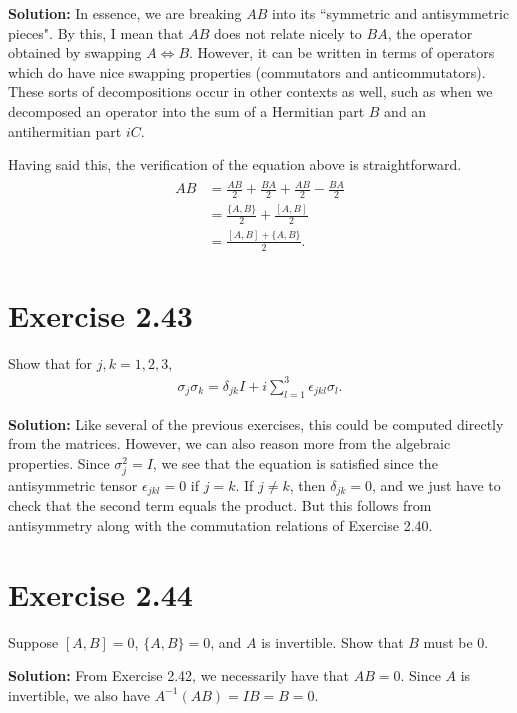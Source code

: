 \documentclass{book}
\begin{document}
    \textbf{Solution:} In essence, we are breaking $AB$ into its ``symmetric and antisymmetric pieces". By this, I mean that $AB$ does not relate nicely to $BA$, the operator obtained by swapping $A \Leftrightarrow B$. However, it can be written in terms of operators which do have nice swapping properties (commutators and anticommutators). These sorts of decompositions occur in other contexts as well, such as when we decomposed an operator into the sum of a Hermitian part $B$ and an antihermitian part $iC$. 
    
    Having said this, the verification of the equation above is straightforward.
    \begin{align}
    \begin{aligned}
        AB &= \frac{AB}{2} + \frac{BA}{2} + \frac{AB}{2} - \frac{BA}{2} \\
        &= \frac{\{A,B\}}{2} + \frac{[A,B]}{2} \\
        &= \frac{[A,B] + \{A,B\}}{2}.
    \end{aligned}
    \end{align}
    
\section*{Exercise 2.43}
    Show that for $j,k = 1,2,3$,
    \begin{align}
        \sigma_j \sigma_k = \delta_{jk} I + i \sum_{l=1}^3 \epsilon_{jkl} \sigma_l.
    \end{align}
    
    \textbf{Solution:} Like several of the previous exercises, this could be computed directly from the matrices. However, we can also reason more from the algebraic properties. Since $\sigma_j^2 = I$, we see that the equation is satisfied since the antisymmetric tensor $\epsilon_{jkl} = 0$ if $j = k$. If $j\neq k$, then $\delta_{jk} = 0$, and we just have to check that the second term equals the product. But this follows from antisymmetry along with the commutation relations of Exercise 2.40.
    
\section*{Exercise 2.44}
    Suppose $[A, B] = 0$, $\{A, B\} = 0$, and $A$ is invertible. Show that $B$ must be 0.
    
    \textbf{Solution:} From Exercise 2.42, we necessarily have that $AB = 0$. Since $A$ is invertible, we also have $A^{-1} (AB) = I B = B = 0$. 
    
\end{document}
